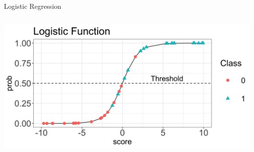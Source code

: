 \documentclass[11pt,compress,t,notes=noshow, xcolor=table]{beamer}
\begin{document}
\begin{vbframe}{Logistic Regression}
\begin{columns}
\begin{column}{0.6\textwidth}
\begin{center}
  \includegraphics[width=1\textwidth]{slides/supervised-classification/figure/nutshell_classif_logistic_function.png}
\end{center}
\end{column}
\end{columns}



\end{vbframe}



\end{document}
